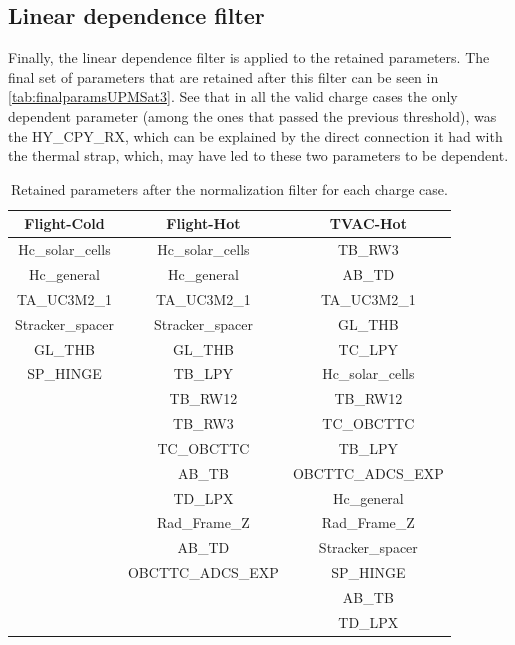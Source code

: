 \subsection{Linear dependence filter}
Finally, the linear dependence filter is applied to the retained parameters. The final set of parameters that are retained after this filter can be seen in \autoref{tab:finalparamsUPMSat3}. See that in all the valid charge cases the only dependent parameter (among the ones that passed the previous threshold), was the HY\_CPY\_RX, which can be explained by the direct connection it had with the thermal strap, which, may have led to these two parameters to be dependent.
\begin{table}[H]
    \centering
    \caption{Retained parameters after the normalization filter for each charge case.}
    \label{tab:finalparamsUPMSat3}
    \begin{tabular}{c c  c}
    \toprule
    \multicolumn{1}{c}{\textbf{Flight-Cold}} & \multicolumn{1}{c}{\textbf{Flight-Hot}}  & \multicolumn{1}{c}{\textbf{TVAC-Hot}} \\ \midrule
    Hc\_solar\_cells  & Hc\_solar\_cells  &  TB\_RW3  \\
    Hc\_general  & Hc\_general  &  AB\_TD  \\
    TA\_UC3M2\_1  & TA\_UC3M2\_1  &  TA\_UC3M2\_1  \\
    Stracker\_spacer  & Stracker\_spacer  &  GL\_THB  \\
    GL\_THB  & GL\_THB  &  TC\_LPY  \\
    SP\_HINGE  & TB\_LPY  &  Hc\_solar\_cells  \\
        & TB\_RW12  &  TB\_RW12  \\
        & TB\_RW3  &  TC\_OBCTTC  \\
        & TC\_OBCTTC  &  TB\_LPY  \\
        & AB\_TB  &  OBCTTC\_ADCS\_EXP  \\
        & TD\_LPX  &  Hc\_general  \\
        & Rad\_Frame\_Z  &  Rad\_Frame\_Z  \\
        & AB\_TD &  Stracker\_spacer  \\
        & OBCTTC\_ADCS\_EXP  &  SP\_HINGE  \\
        & & AB\_TB  \\
        & & TD\_LPX \\
        \bottomrule
    \end{tabular}
\end{table}

